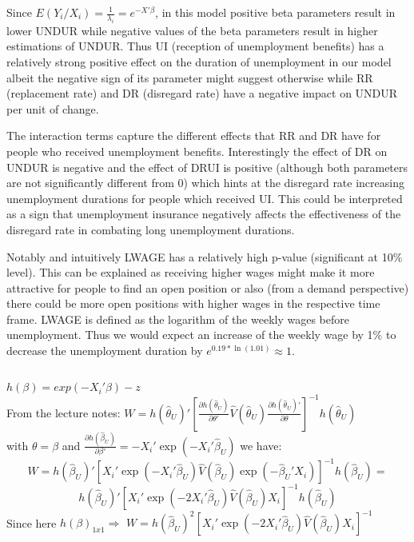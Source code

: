 \documentclass[11pt]{article}
\theoremstyle{break}
\begin{document}
Since $E(Y_i/X_i) = \frac{1}{\lambda_i} = e^{-X'\beta}$, in this model positive beta parameters result in lower UNDUR while negative values of the beta parameters result in higher estimations of UNDUR.
Thus UI (reception of unemployment benefits) has a relatively strong positive effect on the duration of unemployment in our model albeit the negative sign of its parameter might suggest otherwise while RR (replacement rate) and DR (disregard rate) have a negative impact on UNDUR per unit of change.

The interaction terms capture the different effects that RR and DR have for people who received unemployment benefits. Interestingly the effect of DR on UNDUR is negative and the effect of DRUI is positive (although both parameters are not significantly different from 0) which hints at the disregard rate increasing unemployment durations for people which received UI. This could be interpreted as a sign that unemployment insurance negatively affects the effectiveness of the disregard rate in combating long unemployment durations.

Notably and intuitively LWAGE has a relatively high p-value (significant at 10\% level). This can be explained as receiving higher wages might make it more attractive for people to find an open position or also (from a demand perspective) there could be more open positions with higher wages in the respective time frame. LWAGE is defined as the logarithm of the weekly wages before unemployment. Thus we would expect an increase of the weekly wage by 1\% to decrease the unemployment duration by $e^{0.19*\ln(1.01)} \approx 1$.


\subsection{}
$h(\beta) = exp(-X_i'\beta) - z$ \\
From the lecture notes: $W=h(\hat{\theta}_U)'[\frac{\partial h(\hat{\theta}_U)}{\partial \theta'}\hat{V}(\hat{\theta}_U)\frac{\partial h(\hat{\theta}_U)'}{\partial \theta}]^{-1}h(\hat{\theta}_U)$ \\
with $\theta=\beta$ and $\frac{\partial h(\hat{\beta}_U)}{\partial \beta'} = -X_i'\exp(-X_i'\hat{\beta}_U)$ we have: \\
$$W=h(\hat{\beta}_U)'[X_i'\exp(-X_i'\hat{\beta}_U)\hat{V}(\hat{\beta}_U)\exp(-\hat{\beta}_U'X_i)]^{-1}h(\hat{\beta}_U) = $$ 
$$ h(\hat{\beta}_U)'[X_i'\exp(-2X_i'\hat{\beta}_U)\hat{V}(\hat{\beta}_U)X_i]^{-1}h(\hat{\beta}_U)$$
 Since here $h(\beta)_{1x1} \Rightarrow$ $W=h(\hat{\beta}_U)^2[X_i'\exp(-2X_i'\hat{\beta}_U)\hat{V}(\hat{\beta}_U)X_i]^{-1}$ \\
\end{document}
